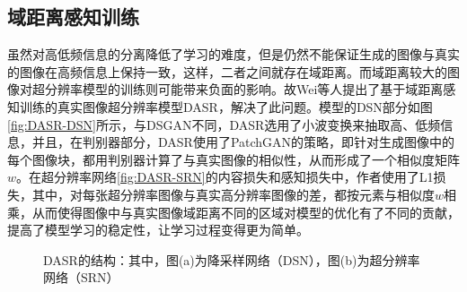 \subsection{域距离感知训练}
虽然对高低频信息的分离降低了学习的难度，但是仍然不能保证生成的图像与真实的图像在高频信息上保持一致，这样，二者之间就存在域距离。而域距离较大的图像对超分辨率模型的训练则可能带来负面的影响。故Wei等人\cite{Wei_2021_CVPR}提出了基于域距离感知训练的真实图像超分辨率模型DASR，解决了此问题。模型的DSN部分如图\ref{fig:DASR-DSN}所示，与DSGAN不同，DASR选用了小波变换来抽取高、低频信息，并且，在判别器部分，DASR使用了PatchGAN的策略，即针对生成图像中的每个图像块，都用判别器计算了与真实图像的相似性，从而形成了一个相似度矩阵$w$。在超分辨率网络\ref{fig:DASR-SRN}的内容损失和感知损失中，作者使用了L1损失，其中，对每张超分辨率图像与真实高分辨率图像的差，都按元素与相似度$w$相乘，从而使得图像中与真实图像域距离不同的区域对模型的优化有了不同的贡献，提高了模型学习的稳定性，让学习过程变得更为简单。

\begin{figure}[htbp]
    \hfill
    \caption{DASR的结构：其中，图(a)为降采样网络（DSN），图(b)为超分辨率网络（SRN）}	
    \label{fig:DASR}
\end{figure}


